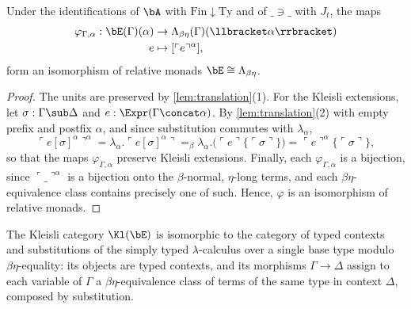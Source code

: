 \begin{proposition}\label{prop:lambda}
    Under the identifications of $\bA$ with $\mathrm{Fin} \downarrow \mathrm{Ty}$ and of $\_ \ni \_$ with $J_t$, the maps
    \begin{align*}
        \varphi_{\Gamma, \alpha} : \bE(\Gamma)(\alpha) &\to \Lambda_{\beta\eta}(\Gamma)(\llbracket \alpha \rrbracket)\\
        e &\mapsto [\ulcorner e \urcorner^\alpha],
    \end{align*}
    form an isomorphism of relative monads $\bE \cong \Lambda_{\beta\eta}$.
\end{proposition}

\begin{proof}
    The units are preserved by \cref{lem:translation}(1). For the Kleisli extensions, let $\sigma : \Gamma \sub \Delta$ and $e : \Expr(\Gamma \concat \alpha)$. By \cref{lem:translation}(2) with empty prefix and postfix $\alpha$, and since substitution commutes with $\lambda_\alpha$,
    \[
    \ulcorner e[\sigma]^\alpha \urcorner^\alpha = \lambda_\alpha. \ulcorner e[\sigma]^\alpha \urcorner =_\beta \lambda_\alpha. \big(\ulcorner e \urcorner\{\ulcorner \sigma \urcorner\}\big) = \ulcorner e \urcorner^\alpha\{\ulcorner \sigma \urcorner\},
    \]
    so that the maps $\varphi_{\Gamma,\alpha}$ preserve Kleisli extensions. Finally, each $\varphi_{\Gamma, \alpha}$ is a bijection, since $\ulcorner \_ \urcorner^\alpha$ is a bijection onto the $\beta$-normal, $\eta$-long terms, and each $\beta\eta$-equivalence class contains precisely one of such. Hence, $\varphi$ is an isomorphism of relative monads.
\end{proof}

\begin{corollary}\label{cor:kleisli}
    The Kleisli category $\Kl(\bE)$ is isomorphic to the category of typed contexts and substitutions of the simply typed $\lambda$-calculus over a single base type modulo $\beta\eta$-equality: its objects are typed contexts, and its morphisms $\Gamma \to \Delta$ assign to each variable of $\Gamma$ a $\beta\eta$-equivalence class of terms of the same type in context $\Delta$, composed by substitution.
\end{corollary}

